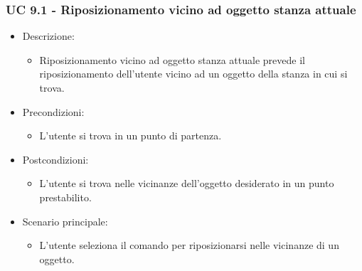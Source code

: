 \subsubsection{UC 9.1 - Riposizionamento vicino ad oggetto stanza attuale}
\begin{itemize}

	\item Descrizione:
	\begin{itemize}
		\item Riposizionamento vicino ad oggetto stanza attuale prevede il riposizionamento dell'utente vicino ad un oggetto
della stanza in cui si trova.
	\end{itemize}
	
	\item Precondizioni:
	\begin{itemize}
		\item L'utente si trova in un punto di partenza.
	\end{itemize}
	
	\item Postcondizioni:
	\begin{itemize}
		\item L'utente si trova nelle vicinanze dell'oggetto desiderato in un punto prestabilito.
	\end{itemize}
	
	\item Scenario principale:
	\begin{itemize}
		\item L'utente seleziona il comando per riposizionarsi nelle vicinanze di un oggetto.
	\end{itemize}
	
\end{itemize}

